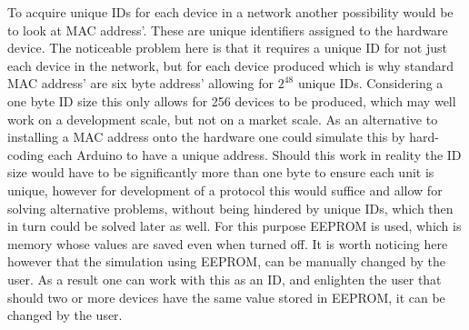 To acquire unique IDs for each device in a network another possibility would be to look at MAC address'.
These are unique identifiers assigned to the hardware device.
The noticeable problem here is that it requires a unique ID for not just each device in the network, but for each device produced which is why standard MAC address' are six byte address' allowing for $2^{48}$ unique IDs.
Considering a one byte ID size this only allows for 256 devices to be produced, which may well work on a development scale, but not on a market scale.
As an alternative to installing a MAC address onto the hardware one could simulate this by hard-coding each Arduino to have a unique address.
Should this work in reality the ID size would have to be significantly more than one byte to ensure each unit is unique, however for development of a protocol this would suffice and allow for solving alternative problems, without being hindered by unique IDs, which then in turn could be solved later as well.
For this purpose EEPROM is used, which is memory whose values are saved even when turned off.
It is worth noticing here however that the simulation using EEPROM, can be manually changed by the user. 
As a result one can work with this as an ID, and enlighten the user that should two or more devices have the same value stored in EEPROM, it can be changed by the user.

